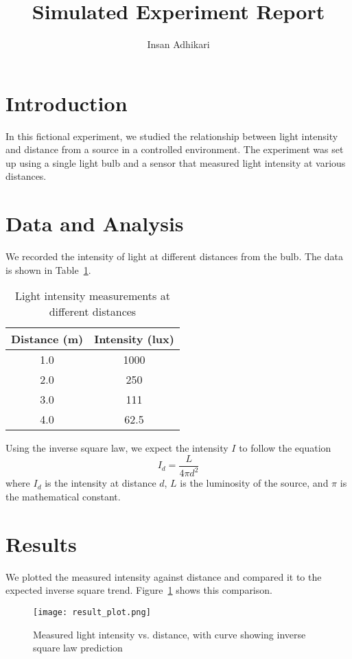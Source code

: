 \documentclass{article}
\title{Simulated Experiment Report}
\author{Insan Adhikari}
\date{}
\begin{document}
\maketitle

\section{Introduction}
In this fictional experiment, we studied the relationship between light intensity and distance from a source in a controlled environment. The experiment was set up using a single light bulb and a sensor that measured light intensity at various distances.

\section{Data and Analysis}
We recorded the intensity of light at different distances from the bulb. The data is shown in Table~\ref{tab:data}.

\begin{table}[h]
\centering
\caption{Light intensity measurements at different distances}
\label{tab:data}
\begin{tabular}{|c|c|}
\hline
Distance (m) & Intensity (lux) \\
\hline
1.0 & 1000 \\
2.0 & 250 \\
3.0 & 111 \\
4.0 & 62.5 \\
\hline
\end{tabular}
\end{table}

Using the inverse square law, we expect the intensity $I$ to follow the equation
\begin{equation}
I_d = \frac{L}{4\pi d^2}
\label{eq:intensity}
\end{equation}
where $I_d$ is the intensity at distance $d$, $L$ is the luminosity of the source, and $\pi$ is the mathematical constant.

\section{Results}
We plotted the measured intensity against distance and compared it to the expected inverse square trend. Figure~\ref{fig:results} shows this comparison.

\begin{figure}[h]
\centering
\texttt{[image: result\_plot.png]}
\caption{Measured light intensity vs. distance, with curve showing inverse square law prediction}
\label{fig:results}
\end{figure}
\end{document}
